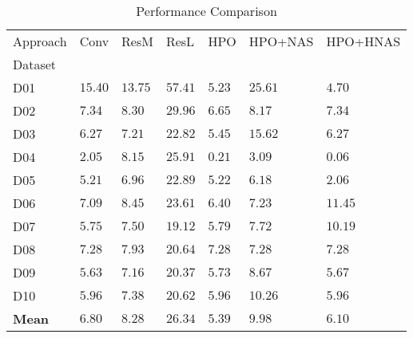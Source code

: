 \begin{table}
\caption{Performance Comparison}
\label{tab:results}
\begin{tabular}{lllllll}
\toprule
Approach & Conv & ResM & ResL & HPO & HPO+NAS & HPO+HNAS \\
Dataset &  &  &  &  &  &  \\
\midrule
D01 & $15.40$ & $13.75$ & $57.41$ & $5.23$ & $25.61$ & $\mathbf{4.70}$ \\
D02 & $7.34$ & $8.30$ & $29.96$ & $\mathbf{6.65}$ & $8.17$ & $7.34$ \\
D03 & $6.27$ & $7.21$ & $22.82$ & $\mathbf{5.45}$ & $15.62$ & $6.27$ \\
D04 & $2.05$ & $8.15$ & $25.91$ & $0.21$ & $3.09$ & $\mathbf{0.06}$ \\
D05 & $5.21$ & $6.96$ & $22.89$ & $5.22$ & $6.18$ & $\mathbf{2.06}$ \\
D06 & $7.09$ & $8.45$ & $23.61$ & $\mathbf{6.40}$ & $7.23$ & $11.45$ \\
D07 & $\mathbf{5.75}$ & $7.50$ & $19.12$ & $5.79$ & $7.72$ & $10.19$ \\
D08 & $\mathbf{7.28}$ & $7.93$ & $20.64$ & $\mathbf{7.28}$ & $\mathbf{7.28}$ & $\mathbf{7.28}$ \\
D09 & $\mathbf{5.63}$ & $7.16$ & $20.37$ & $5.73$ & $8.67$ & $5.67$ \\
D10 & $\mathbf{5.96}$ & $7.38$ & $20.62$ & $\mathbf{5.96}$ & $10.26$ & $\mathbf{5.96}$ \\
\textbf{Mean} & $6.80$ & $8.28$ & $26.34$ & $\mathbf{5.39}$ & $9.98$ & $6.10$ \\
\bottomrule
\end{tabular}
\end{table}
